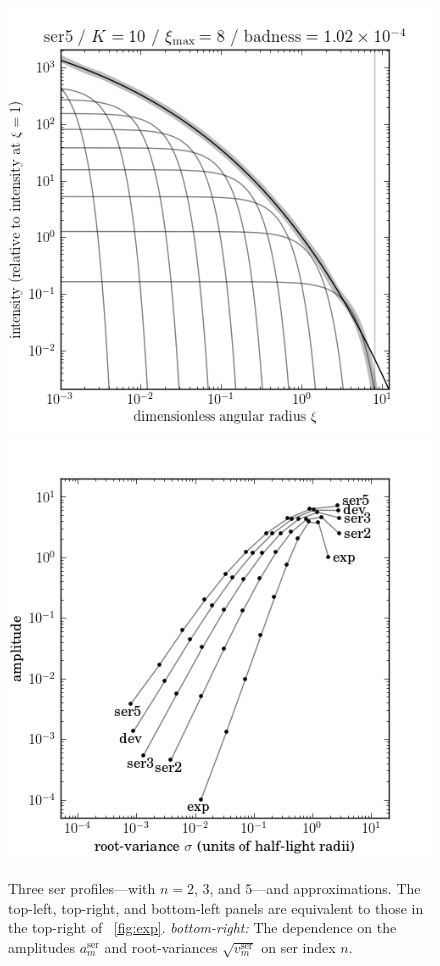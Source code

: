 \documentclass[12pt,pdftex,preprint]{aastex}
\newlength{\figurewidth}
\newcommand{\ser}{\mathrm{ser}}
\begin{document}
\begin{figure}
\includegraphics[width=\figurewidth]{ser5_K10_MR08_profile_log.png}%
\includegraphics[width=\figurewidth]{mixtures_vs_model_K10.png}
\caption{Three ser profiles---with $n=2$, $3$, and $5$---and
  approximations.  The top-left, top-right, and bottom-left panels are
  equivalent to those in the top-right of \figurename~\ref{fig:exp}.
  \textsl{bottom-right:} The dependence on the amplitudes $a^{\ser}_m$
  and root-variances $\sqrt{v^{\ser}_m}$ on ser index $n$.}
\end{figure}
\end{document}
